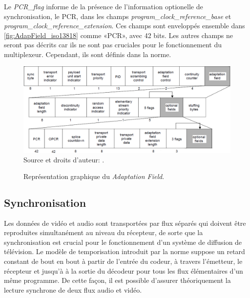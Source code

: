 \documentclass[12pt,a4paper]{article}
\begin{document}
Le \textit{PCR\hspace{0.1mm}\_\hspace{0.1mm}flag} informe de la présence de l'information optionelle de synchronisation, le PCR, dans les champs \textit{program\hspace{0.1mm}\_\hspace{0.1mm}clock\hspace{0.1mm}\_\hspace{0.1mm}reference\hspace{0.1mm}\_\hspace{0.1mm}base} et \textit{program\hspace{0.1mm}\_\hspace{0.1mm}clock\hspace{0.1mm}\_\hspace{0.1mm}reference\hspace{0.1mm}\_\hspace{0.1mm}extension}. Ces champs sont enveloppés ensemble dans \autoref{fig:AdapField_iso13818} comme «PCR», avec 42 bits. Les autres champs ne seront pas décrits car ils ne sont pas cruciales pour le fonctionnement du multiplexeur. Cependant, ils sont définis dans la norme\cite[2.4.3.5]{ISO}.

\begin{figure}
\centering
\caption{Représentation graphique du  \textit{Adaptation Field}.}
\includegraphics[width=1\linewidth]{pictures/AdapField_iso13818.png}
\\Source et droits d'auteur: \cite[F.0.1]{ISO}.
\label{fig:AdapField_iso13818}
\end{figure}

\subsection{Synchronisation}
\label{Timing}

Les données de vidéo et audio sont transportées par flux séparés qui doivent être reproduites simultanément au niveau du récepteur, de sorte que la synchronisation est crucial pour le fonctionnement d'un système de diffusion de télévision. Le modèle de temporisation introduit par la norme suppose un retard constant de bout en bout à partir de l'entrée du codeur, à travers l'émetteur, le récepteur et jusqu'à à la sortie du décodeur pour tous les flux élémentaires d'un même programme. De cette façon, il est possible d'assurer théoriquement la lecture synchrone de deux flux audio et vidéo.
\end{document}
